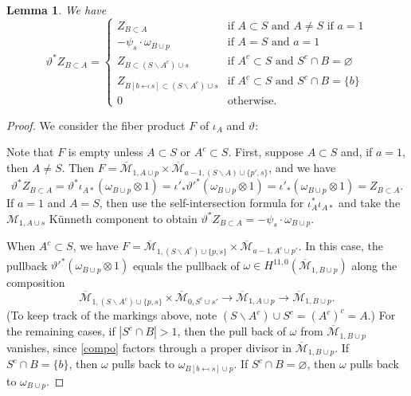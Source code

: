\documentclass[12pt]{amsart}
\newtheorem{lem}[thm]{Lemma}
\theoremstyle{definition}
\numberwithin{equation}{section}
\newcommand{\M}{\mathcal{M}}
\newcommand{\Mb}{\overline{\M}}
\theoremstyle{definition} %
\theoremstyle{remark}
\begin{document}
\begin{lem}
We have 
\begin{equation} \label{theta}
 \vartheta^* Z_{B \subset A} =   \begin{cases} Z_{B \subset A} & \text{if $A \subset S$ and $A \neq S$ if $a = 1$}  \\
- \psi_s \cdot \omega_{B \cup p} & \text{if $A = S$ and $a = 1$} \\
 Z_{B \subset (S\smallsetminus A^c) \cup s} & \text{if $A^c \subset S$ and $S^c \cap B = \varnothing$} \\
 Z_{B[b \mapsfrom s] \subset (S \smallsetminus A^c) \cup s} & \text{if $A^c \subset S$ and $S^c \cap B = \{b\}$} \\
 0 & \text{otherwise.} \end{cases}
\end{equation}
\end{lem}
\begin{proof}
We consider the fiber product $F$ of $\iota_A$ and $\vartheta$:
\begin{center}
\end{center}
Note that $F$ is empty unless $A \subset S$ or $A^c \subset S$.
First, suppose $A \subset S$ and, if $a = 1$, then $A \neq S$. Then $F = \Mb_{1,A \cup p} \times \Mb_{a-1, (S \smallsetminus A) \cup \{p', s\}}$, and we have
\[\vartheta^*Z_{B \subset A} = \vartheta^*\iota_{A*}(\omega_{B \cup p} \otimes 1) = \iota'_*\vartheta'^*(\omega_{B \cup p} \otimes 1) = \iota'_*(\omega_{B \cup p} \otimes 1) = Z_{B \subset A}.\]
If $a = 1$ and $A = S$, then use the self-intersection formula for $\iota_{A}^*\iota_{A*}$ and take the $\M_{1, A \cup s}$ K\"unneth component to obtain $\vartheta^* Z_{B \subset A} = -\psi_s \cdot \omega_{B \cup p}$.

When $A^c \subset S$, we have $F = \Mb_{1,(S \smallsetminus A^c) \cup \{p, s\} } \times \Mb_{a-1, A^c \cup p'}$. In this case, the pullback $\vartheta'^*(\omega_{B \cup p} \otimes 1)$ equals the pullback of $\omega \in H^{11,0}(\Mb_{1, B \cup p})$ along the composition
\begin{equation} \label{compo}\Mb_{1,(S \smallsetminus A^c) \cup \{p, s\}} \times \Mb_{0, S^c \cup s'} \to \Mb_{1, A \cup p} \to \Mb_{1, B \cup p}. 
\end{equation}
(To keep track of the markings above, note $(S \smallsetminus A^c) \cup S^c = (A^c)^c = A$.)
For the remaining cases, if $|S^c \cap B| > 1$, then the pull back of $\omega$ from $\Mb_{1, B \cup p}$ vanishes, since \eqref{compo} factors through a proper divisor in $\Mb_{1,B \cup p}$. If $S^c \cap B = \{b\}$, then $\omega$ pulls back to $\omega_{B[b \mapsfrom s]  \cup p}$. If $S^c \cap B = \varnothing$, then $\omega$ pulls back to $\omega_{B \cup p}$.
\end{proof}
\end{document}
